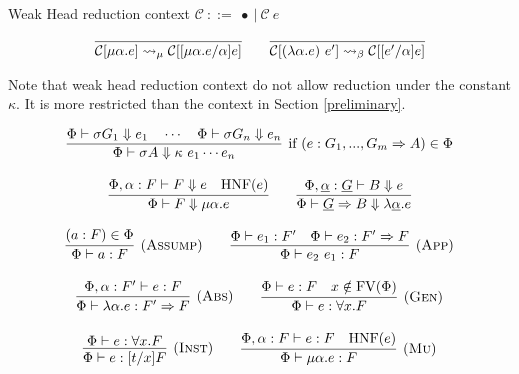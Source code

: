 \documentclass{llncs}
\begin{document}
\begin{definition}
  Weak Head reduction context $ \mathcal{C} \  ::=  \ \bullet \ | \ \mathcal{C}\ e$
\end{definition}


\begin{definition}
  \label{label}
\[\begin{array}{c}

\infer{{\mathcal{C}[\mu \alpha . e]} \leadsto_\mu \mathcal{C}[[\mu \alpha . e/\alpha]e]}{} 
\quad \quad
\infer{\mathcal{C}[(\lambda \alpha . e) \ e'] \leadsto_\beta \mathcal{C}[[e'/\alpha] e] }{}

  \end{array}
\]

\end{definition}

Note that weak head reduction context do not allow reduction under the constant $\kappa$. It is 
more restricted than the context in Section \ref{preliminary}.


\begin{definition}

  
\[\begin{array}{c}
  \infer[\text{if}~(e : G_1,..., G_m \Rightarrow A) \in \Phi]
    {\Phi \vdash \sigma A \Downarrow \kappa~e_1 \cdots e_n}
    { \Phi \vdash \sigma G_1 \Downarrow e_1 \quad \cdots \quad \Phi \vdash \sigma G_n \Downarrow e_n 
      } 
\\ \\ 
    \infer
    {\Phi \vdash F \Downarrow \mu \alpha . e }{\Phi, \alpha : F \vdash F \Downarrow e & \mathrm{HNF}(e)} 
\quad\quad
    \infer
    {\Phi \vdash \underline{G} \Rightarrow B \Downarrow \lambda \underline{\alpha} . e}
    {\Phi, \underline{\alpha} : \underline{G} \vdash  B \Downarrow e}
  \end{array}
\]
\end{definition}




\begin{definition}
\label{proofsystem}
\[
\begin{array}{c}
\infer[(\textsc{Assump})]{\Phi \vdash a : F}{(a :  F) \in \Phi}    
\quad\quad
\infer[(\textsc{App})]{\Phi \vdash e_2\ e_1 : F}{\Phi \vdash e_1 : F' & \Phi \vdash e_2 : F' \Rightarrow F}
\\
\\

\infer[(\textsc{Abs})]{\Phi \vdash \lambda \alpha.e : F' \Rightarrow F}{\Phi, \alpha : F' \vdash e : F}
\quad\quad
\infer[(\textsc{Gen})]{\Phi \vdash e: \forall x . F}{\Phi \vdash e :  F & x \notin \mathrm{FV}(\Phi)}

\\
\\
\infer[(\textsc{Inst})]{\Phi \vdash e : [t/x]F}{\Phi \vdash e : \forall x . F}
\quad\quad
\infer[(\textsc{Mu})]{\Phi \vdash \mu \alpha . e : F}{\Phi, \alpha : F \vdash e : F & \mathrm{HNF}(e)}
  \end{array}  
\]
\end{definition}
\end{document}
